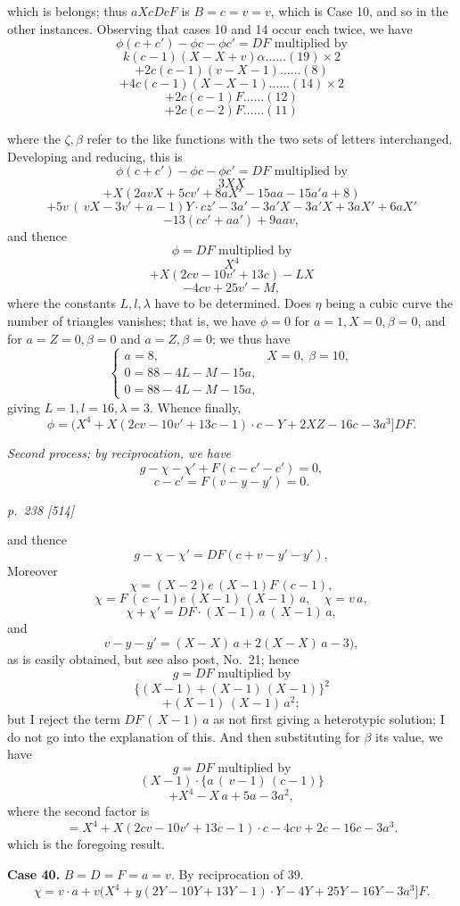 \documentclass[11pt,a4paper]{article}
\theoremstyle{plain}
\theoremstyle{definition}
\begin{document}
which is belongs; thus $aXcDcF$ is $B=c=v=v$, which is Case 10, and so in the
other instances.  Observing that cases 10 and 14 occur each twice, we have
\[
\phi(c+c')-\phi c-\phi c'=DF \text{ multiplied by}
\]
\[
k(c-1)(X-X+v)\alpha\ldots\ldots(19)\times 2
\]
\[
+2c(c-1)(v-X-1)\ldots\ldots(8)
\]
\[
+4c(c-1)(X-X-1)\ldots\ldots(14)\times 2
\]
\[
+2c(c-1)F\ldots\ldots(12)
\]
\[
+2c(c-2)F\ldots\ldots(11)
\]

where the $\zeta, \beta$ refer to the like functions with the two sets of letters interchanged.
Developing and reducing, this is
\[
\phi(c+c')-\phi c-\phi c'=DF \text{ multiplied by}
\]
\[
3XX
\]
\[
+X(2avX+5cv'+8aX'-15aa-15a'a+8)
\]
\[
+5v\,(\,vX-3v'+a-1)Y\cdot cz'-3a'-3a'X-3a'X+3aX'+6aX'
\]
\[
-13(cc'+aa')+9aav,
\]
and thence
\[
\phi=DF\text{ multiplied by}
\]
\[
X^4
\]
\[
+X(2cv-10v'+13c)-LX
\]
\[
-4cv+25v'-M,
\]
where the constants $L, l, \lambda$ have to be determined.  Does $\eta$ being a cubic curve the
number of triangles vanishes; that is, we have $\phi=0$ for $a=1, X=0, \beta=0$, and for
$a=Z=0, \beta=0$ and $a=Z, \beta=0$; we thus have
\[
\begin{cases}
a=8, & X=0, \ \beta=10, \\
0=88-4L-M-15a, \\
0=88-4L-M-15a,
\end{cases}
\]
giving $L=1, l=16, \lambda=3$.  Whence finally,
\[
\phi=(X^4+X(2cv-10v'+13c-1)\cdot c-Y+2XZ-16c-3a^3]DF.
\]

\textit{Second process; by reciprocation, we have}
\[
g-\chi-\chi'+F(c-c'-c')=0,
\]
\[
c-c'=F(v-y-y')=0.
\]

\clearpage

\bigskip
\textit{p.~238 [514]}
\smallskip

and thence
\[
g-\chi-\chi'=DF(c+v-y'-y'),
\]
Moreover
\[
\chi=(X-2)e\,(X-1)F\,(c-1),
\]
\[
\chi=F\,(\,c-1)e\,(X-1)\,(X-1)\,a, \quad \chi=v\,a,
\]
\[
\chi+\chi'=DF\cdot (X-1)\,a\,(\,X-1)\,a,
\]
and
\[
v-y-y'=(X-X)\,a+2(X-X)\,a-3),
\]
as is easily obtained, but see also post, No.\ 21; hence
\[
g=DF\text{ multiplied by}
\]
\[
\{(X-1)+(X-1)\,(X-1)\}^2
\]
\[
+(X-1)\,(X-1)\,a^2;
\]
but I reject the term $DF\,(\,X-1)\,a$ as not first giving a heterotypic solution; I do
not go into the explanation of this.  And then substituting for $\beta$ its value, we have
\[
g=DF\text{ multiplied by}
\]
\[
(X-1)\cdot \{a\,(\,v-1)\,(c-1)\}
\]
\[
+X^4-X\,a+5a-3a^2,
\]
where the second factor is
\[
=X^4+X(2cv-10v'+13c-1)\cdot c-4cv+2c-16c-3a^3.
\]
which is the foregoing result.

\textbf{Case 40.}  $B=D=F=a=v$.  By reciprocation of 39.
\[
\chi=v\cdot a+v(X^4+y(2Y-10Y+13Y-1)\cdot Y-4Y+25Y-16Y-3a^3]F.
\]
\end{document}
